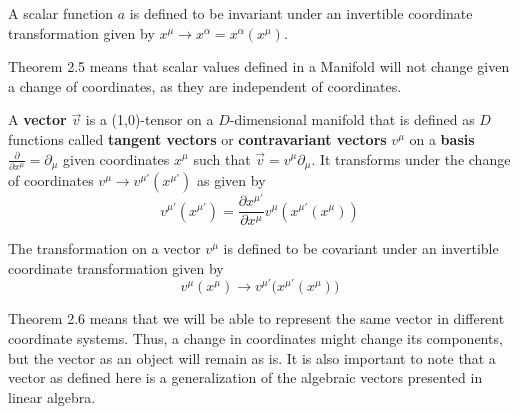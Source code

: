 \documentclass{article}
\begin{document}
 	\pagebreak
 		\begin{thm}
 			A scalar function $a$ is defined to be invariant under an invertible coordinate transformation given by $x^\mu \to x^\alpha = x^\alpha (x^\mu)$.
 		\end{thm} \noindent
 		Theorem 2.5 means that scalar values defined in a Manifold will not change given a change of coordinates, as they are independent of coordinates.
 		\begin{defn}
 			A \textbf{vector} $\vec{v}$ is a (1,0)-tensor on a $D$-dimensional manifold that is defined as $D$ functions called \textbf{tangent vectors} or \textbf{contravariant vectors} $v^\mu$ on a \textbf{basis} $\frac{\partial}{\partial x^\mu} = \partial_\mu$ given coordinates $x^\mu$ such that $\vec{v}= v^\mu \partial_\mu$. It transforms under the change of coordinates $v^\mu \to v^{\mu'} (x^{\mu'})$ as given by
 			$$v^{\mu'} (x^{\mu'}) = \frac{\partial x^{\mu'}}{\partial x^\mu} v^\mu \left( x^{\mu'} (x^\mu) \right) $$
 		\end{defn}
 		\begin{thm}
 			The transformation on a vector $v^\mu$ is defined to be covariant under an invertible coordinate transformation given by $$v^\mu(x^\mu) \to v^{\mu'} \big(x^{\mu'} (x^\mu)\big) $$
 		\end{thm} \noindent
 		Theorem 2.6 means that we will be able to represent the same vector in different coordinate systems. Thus, a change in coordinates might change its components, but the vector as an object will remain as is. It is also important to note that a vector as defined here is a generalization of the algebraic vectors presented in linear algebra. 
 		
\end{document}
